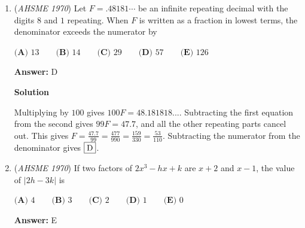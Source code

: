 \begin{enumerate}
 \textbf{Answer: }C



\textbf{Solution}

In order, the points from left to right are $A, P, Q, B$.  Let the lengths between successive points be $x, 2, y$, respectively.  

 Since $\frac{AP}{PB} = \frac{2}{3}$, we have $\frac{x}{2 + y} = \frac{2}{3}$.

 Since $\frac{AQ}{QB} = \frac{3}{4}$, we have $\frac{x + 2}{y} = \frac{3}{4}$.

 The first equation gives $x = \frac{2}{3}(2 + y)$.  Plugging that in to the second equation gives:

 $\frac{\frac{2}{3}(2 + y) + 2}{y} = \frac{3}{4}$.

 $\frac{2}{3}(2 + y) + 2 = \frac{3}{4}y$
$\frac{4}{3} + \frac{2}{3}y + 2 = \frac{3}{4}y$
$\frac{10}{3} = \frac{1}{12}y$
$y = 40$

 Since $x = \frac{2}{3}(2 + y)$, we have $x = 28$.  The length of the entire segment is $x + 2 + y$, which is $70$, or option $\fbox{C}$.

 


	\item (\textit{AHSME 1970}) Let $F=.48181\cdots$ be an infinite repeating decimal with the digits $8$ and $1$ repeating. 
When $F$ is written as a fraction in lowest terms, the denominator exceeds the numerator by


 $\textbf{(A) }13\qquad \textbf{(B) }14\qquad \textbf{(C) }29\qquad \textbf{(D) }57\qquad  \textbf{(E) }126$

 \textbf{Answer: }D



\textbf{Solution}

Multiplying by $100$ gives $100F = 48.181818...$.  Subtracting the first equation from the second gives $99F = 47.7$, and all the other repeating parts cancel out.  This gives $F = \frac{47.7}{99} = \frac{477}{990} = \frac{159}{330} = \frac{53}{110}$.  Subtracting the numerator from the denominator gives $\fbox{D}$.

 


	\item (\textit{AHSME 1970}) If two factors of $2x^3-hx+k$ are $x+2$ and $x-1$, the value of $|2h-3k|$ is


 $\textbf{(A) }4\qquad \textbf{(B) }3\qquad \textbf{(C) }2\qquad \textbf{(D) }1\qquad  \textbf{(E) }0$

 \textbf{Answer: }E




\end{enumerate}
